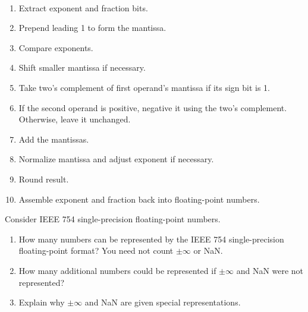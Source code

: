 \documentclass[12pt]{article}
\newenvironment{ex}[2][Exercise]{\begin{trivlist}
		\item[\hskip \labelsep {\bfseries #1}\hskip \labelsep {\bfseries #2.}]}{\end{trivlist}}
\newenvironment{sol}[1][Solution]{\begin{trivlist}
		\item[\hskip \labelsep {\bfseries #1:}]}{\end{trivlist}}
\begin{document}
\begin{sol}
	\
	\begin{enumerate}
		\item Extract exponent and fraction bits.
		\item Prepend leading 1 to form the mantissa.
		\item Compare exponents.
		\item Shift smaller mantissa if necessary.
		\item Take two's complement of first operand's mantissa if its sign bit is 1.
		\item If the second operand is positive, negative it using the two's complement.
		Otherwise, leave it unchanged.
		\item Add the mantissas.
		\item Normalize mantissa and adjust exponent if necessary.
		\item Round result.
		\item Assemble exponent and fraction back into floating-point numbers.
	\end{enumerate}
\end{sol}

\begin{ex}{5.45}
	Consider IEEE 754 single-precision floating-point numbers.
	\begin{enumerate}[label=(\alph*)]
		\item How many numbers can be represented by the IEEE 754 single-precision
		floating-point format? You need not count $\pm\infty$ or NaN.
		\item How many additional numbers could be represented if $\pm \infty$ and
		NaN were not represented?
		\item Explain why $\pm \infty$ and NaN are given special representations.
	\end{enumerate}
\end{ex}
\end{document}
